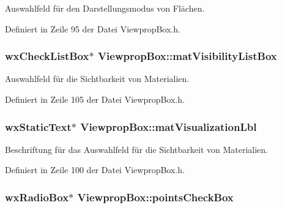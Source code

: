 Auswahlfeld für den Darstellungsmodus von Flächen. 



Definiert in Zeile 95 der Datei Viewprop\-Box.\-h.

\hypertarget{classViewpropBox_a8e6d0646ebdd844f96acde46e63fb74d}{
\subsubsection[{mat\-Visibility\-List\-Box}]{\setlength{\rightskip}{0pt plus 5cm}wx\-Check\-List\-Box$\ast$ Viewprop\-Box\-::mat\-Visibility\-List\-Box\hspace{0.3cm}{\ttfamily [private]}}}\label{classViewpropBox_a8e6d0646ebdd844f96acde46e63fb74d}


Auswahlfeld für die Sichtbarkeit von Materialien. 



Definiert in Zeile 105 der Datei Viewprop\-Box.\-h.

\hypertarget{classViewpropBox_a6352cdc6579ed2b9a7cfdd28a847bfec}{
\subsubsection[{mat\-Visualization\-Lbl}]{\setlength{\rightskip}{0pt plus 5cm}wx\-Static\-Text$\ast$ Viewprop\-Box\-::mat\-Visualization\-Lbl\hspace{0.3cm}{\ttfamily [private]}}}\label{classViewpropBox_a6352cdc6579ed2b9a7cfdd28a847bfec}


Beschriftung für das Auswahlfeld für die Sichtbarkeit von Materialien. 



Definiert in Zeile 100 der Datei Viewprop\-Box.\-h.

\hypertarget{classViewpropBox_a706dfcdceaa1afff899f51eb2ebded81}{
\subsubsection[{points\-Check\-Box}]{\setlength{\rightskip}{0pt plus 5cm}wx\-Radio\-Box$\ast$ Viewprop\-Box\-::points\-Check\-Box\hspace{0.3cm}{\ttfamily [private]}}}\label{classViewpropBox_a706dfcdceaa1afff899f51eb2ebded81}


